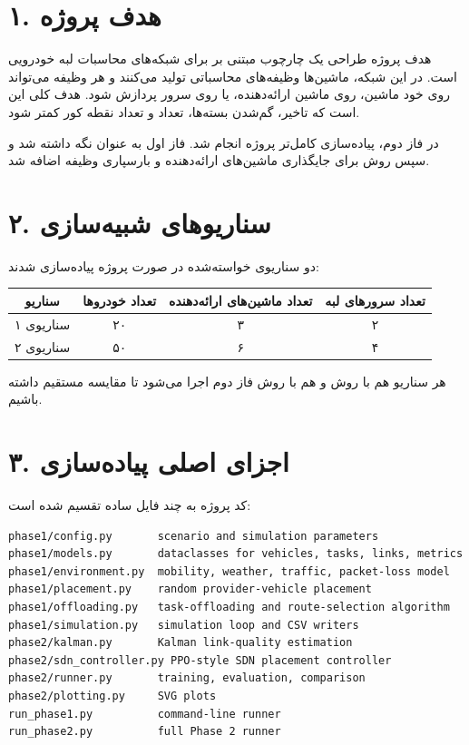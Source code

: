 \documentclass[12pt]{exam}
\begin{document}
\begin{questions}
\question

\section*{۱. هدف پروژه}
هدف پروژه طراحی یک چارچوب مبتنی بر  برای شبکه‌های محاسبات لبه خودرویی
است. در این شبکه، ماشین‌ها وظیفه‌های محاسباتی تولید می‌کنند و هر وظیفه می‌تواند
روی خود ماشین، روی ماشین ارائه‌دهنده، یا روی سرور  پردازش شود. هدف کلی
این است که تاخیر، گم‌شدن بسته‌ها، تعداد  و تعداد نقطه کور کمتر شود.

در فاز دوم، پیاده‌سازی کامل‌تر پروژه انجام شد. فاز اول به عنوان 
نگه داشته شد و سپس روش  برای جایگذاری ماشین‌های ارائه‌دهنده
و بارسپاری وظیفه اضافه شد.

\section*{۲. سناریوهای شبیه‌سازی}
دو سناریوی خواسته‌شده در صورت پروژه پیاده‌سازی شدند:

\begin{center}
\begin{tabular}{|c|c|c|c|}
\hline
سناریو & تعداد خودروها & تعداد ماشین‌های ارائه‌دهنده & تعداد سرورهای لبه \\
\hline
سناریوی ۱ & ۲۰ & ۳ & ۲ \\
\hline
سناریوی ۲ & ۵۰ & ۶ & ۴ \\
\hline
\end{tabular}
\end{center}

هر سناریو هم با روش  و هم با روش فاز دوم اجرا می‌شود تا مقایسه
مستقیم داشته باشیم.

\section*{۳. اجزای اصلی پیاده‌سازی}
کد پروژه به چند فایل ساده تقسیم شده است:

\begin{latin}
\begin{lstlisting}
phase1/config.py       scenario and simulation parameters
phase1/models.py       dataclasses for vehicles, tasks, links, metrics
phase1/environment.py  mobility, weather, traffic, packet-loss model
phase1/placement.py    random provider-vehicle placement
phase1/offloading.py   task-offloading and route-selection algorithm
phase1/simulation.py   simulation loop and CSV writers
phase2/kalman.py       Kalman link-quality estimation
phase2/sdn_controller.py PPO-style SDN placement controller
phase2/runner.py       training, evaluation, comparison
phase2/plotting.py     SVG plots
run_phase1.py          command-line runner
run_phase2.py          full Phase 2 runner
\end{lstlisting}
\end{latin}


\end{questions}
\end{document}
